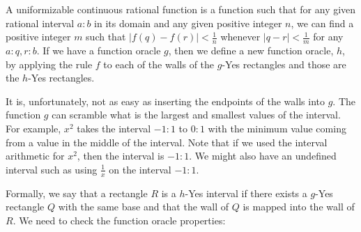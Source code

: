 \documentclass[12pt]{article}
\theoremstyle{remark}
\begin{document}
A uniformizable continuous rational function is a function such that for any given rational interval $a:b$ in its domain and any given positive integer $n$, we can find a positive integer $m$ such that $|f(q) - f(r)| < \frac{1}{n} $ whenever $|q-r| < \frac{1}{m}$ for any $a:q,r:b$. If we have a function oracle $g$, then we define a new function oracle, $h$, by applying the rule $f$ to each of the walls of the $g$-Yes rectangles and those are the $h$-Yes rectangles. 

It is, unfortunately, not as easy as inserting the endpoints of the walls into $g$. The function $g$ can scramble what is the largest and smallest values of the interval. For example, $x^2$ takes the interval $-1:1$ to $0:1$ with the minimum value coming from a value in the middle of the interval. Note that if we used the interval arithmetic for $x^2$, then the interval is $-1:1$. We might also have an undefined interval such as using $\frac{1}{x}$ on the interval $-1:1$.

Formally, we say that a rectangle $R$ is a $h$-Yes interval if there exists a $g$-Yes rectangle $Q$ with the same base and that the wall of $Q$ is mapped into the wall of $R$. We need to check the function oracle properties: 
\end{document}
